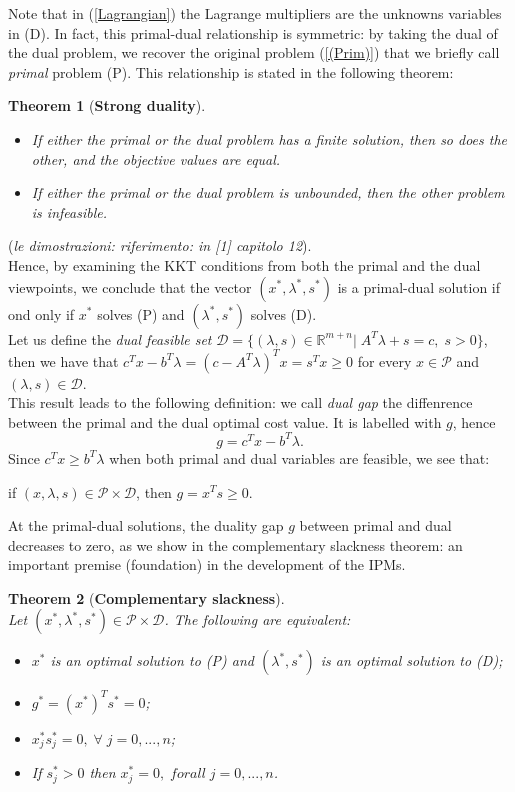 \documentclass[a4paper,10 pt,titlepage,twoside]{book}
\theoremstyle{plain}
\newtheorem{thm}{Theorem}[chapter]
\theoremstyle{definition}
\theoremstyle{remark}
\begin{document}
Note that in (\ref{Lagrangian}) the Lagrange multipliers are the unknowns variables in (D). In fact, this primal-dual relationship is symmetric: by taking the dual of the dual problem, we recover the original problem (\ref{(Prim)}) that we briefly call \textit{primal} problem (P). This relationship is stated in the following theorem:
\begin{thm}[\textbf{Strong duality}] 
	\begin{itemize}
		\
		\item If either the primal or the dual problem has a finite solution, then so does the other, and the objective values are equal.
		\item If either the primal or the dual problem is unbounded, then the other problem is infeasible.
	\end{itemize}
\end{thm}
(\textit{le dimostrazioni: riferimento: in [1] capitolo 12}).\\[0.5 cm] Hence, by examining the KKT conditions from both the primal and the dual viewpoints, we conclude that the vector $(x^{*},\lambda^{*},s^{*})$ is a primal-dual solution if ond only if $x^{*}$ solves (P) and $(\lambda^{*},s^{*})$ solves (D).\\[1cm]
Let us define the \textit{dual feasible set} $\mathcal{D}=\{(\lambda,s)\in\mathbb{R}^{m+n}|\;A^{T}\lambda+s= c,\;s>0\}$, then we have that $c^{T}x-b^{T}\lambda=\left(c-A^{T}\lambda\right)^{T}x=s^{T}x \geq0$ for every $x\in\mathcal{P}$ and $\left(\lambda,s\right)\in\mathcal{D}$.\\
This result leads to the following definition: we call \textit{dual gap} the diffenrence between the primal and the dual optimal cost value. It is labelled with $g$, hence
\begin{equation}\label{dualgap}
g = c^{T}x - b^{T}\lambda.
\end{equation}
Since $c^{T}x\geq b^{T}\lambda$ when both primal and dual variables are feasible, we see that:\begin{center}
	if $(x,\lambda,s)\in\mathcal{P}\times\mathcal{D}$, then $g= x^{T}s \geq0$.
\end{center}
At the primal-dual solutions, the duality gap $g$ between primal and dual decreases to zero, as we show in the complementary slackness theorem: an important premise (foundation) in the development of the IPMs.
\begin{thm}[\textbf{Complementary slackness}] \ \\
	Let $(x^{*},\lambda^{*},s^{*})\in\mathcal{P}\times\mathcal{D}$. The following are equivalent:
	\begin{itemize}
		\item $x^{*}$ is an optimal solution to (P) and $(\lambda^{*},s^{*})$ is an optimal solution to (D);
		\item $g^{*} = (x^{*})^{T}s^{*}=0$;
		\item $x^{*}_{j}s^{*}_{j}=0,\;\forall\; j=0,...,n$;
		\item If $s^{*}_{j} > 0$ then $x^{*}_{j}= 0,\;for all\; j=0,...,n$.
	\end{itemize}
\end{thm}
\end{document}

